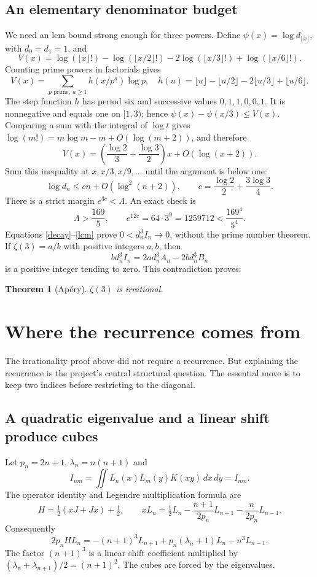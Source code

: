 \documentclass[11pt]{article}
\newcommand{\dd}{\,d}
\newtheorem{theorem}{Theorem}
\begin{document}
\subsection{An elementary denominator budget}
We need an lcm bound strong enough for three powers. Define $\psi(x)=\log d_{\lfloor x\rfloor}$, with $d_0=d_1=1$, and
\[
 V(x)=\log(\lfloor x\rfloor!)-\log(\lfloor x/2\rfloor!)
       -2\log(\lfloor x/3\rfloor!)+\log(\lfloor x/6\rfloor!).
\]
Counting prime powers in factorials gives
\[
 V(x)=\sum_{p\text{ prime},\ a\ge1}h(x/p^a)\log p,\quad
 h(u)=\lfloor u\rfloor-\lfloor u/2\rfloor-2\lfloor u/3\rfloor+\lfloor u/6\rfloor.
\]
The step function $h$ has period six and successive values $0,1,1,0,0,1$. It is nonnegative and equals one on $[1,3)$; hence
$\psi(x)-\psi(x/3)\le V(x)$. Comparing a sum with the integral of $\log t$ gives $\log(m!)=m\log m-m+O(\log(m+2))$, and therefore
\[
 V(x)=\left(\frac{\log2}3+\frac{\log3}2\right)x+O(\log(x+2)).
\]
Sum this inequality at $x,x/3,x/9,\ldots$ until the argument is below one:
\begin{equation}\label{lcm}
 \log d_n\le cn+O(\log^2(n+2)),\qquad
 c=\frac{\log2}2+\frac{3\log3}4.
\end{equation}
There is a strict margin $e^{3c}<\Lambda$. An exact check is
\[
 \Lambda>\frac{169}5,\qquad
 e^{12c}=64\cdot3^9=1259712<\frac{169^4}{5^4}.
\]
Equations \eqref{decay}--\eqref{lcm} prove $0<d_n^3I_n\to0$, without the prime number theorem. If $\zeta(3)=a/b$ with positive integers $a,b$, then
\[
 b d_n^3I_n=2a d_n^3A_n-2b d_n^3B_n
\]
is a positive integer tending to zero. This contradiction proves:
\begin{theorem}[Ap\'ery]
$\zeta(3)$ is irrational.
\end{theorem}

\section{Where the recurrence comes from}
The irrationality proof above did not require a recurrence. But explaining the recurrence is the project's central structural question. The essential move is to keep two indices before restricting to the diagonal.

\subsection{A quadratic eigenvalue and a linear shift produce cubes}
Let $p_n=2n+1$, $\lambda_n=n(n+1)$ and
\[
 I_{nm}=\iint L_n(x)L_m(y)K(xy)\dd x\dd y=I_{mn}.
\]
The operator identity and Legendre multiplication formula are
\[
 H=\tfrac12(xJ+Jx)+\tfrac12,\qquad
 xL_n=\tfrac12L_n-\frac{n+1}{2p_n}L_{n+1}-\frac n{2p_n}L_{n-1}.
\]
Consequently
\begin{equation}\label{tri}
 2p_nHL_n=-(n+1)^3L_{n+1}+p_n(\lambda_n+1)L_n-n^3L_{n-1}.
\end{equation}
The factor $(n+1)^3$ is a linear shift coefficient multiplied by
$(\lambda_n+\lambda_{n+1})/2=(n+1)^2$. The cubes are forced by the eigenvalues.
\end{document}
